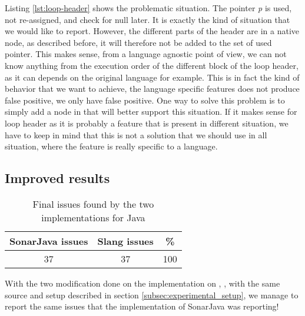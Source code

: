 

Listing \ref{lst:loop-header} shows the problematic situation. The pointer \emph{p} is used, not re-assigned, and check for null later. 
It is exactly the kind of situation that we would like to report. 
However, the different parts of the header are in a native node, as described before, it will therefore not be added to the set of used pointer. 
This makes sense, from a language agnostic point of view, we can not know anything from the execution order of the different block of the loop header, as it can depends on the original language for example. 
This is in fact the kind of behavior that we want to achieve, the language specific features does not produce false positive, we only have false positive. 
One way to solve this problem is to simply add a node in \slang that will better support this situation. 
If it makes sense for loop header as it is probably a feature that is present in different situation, we have to keep in mind that this is not a solution that we should use in all situation, where the feature is really specific to a language.

\subsection{Improved results}
\label{subsec:improved_results}

\begin{table}[h]
	\centering
	\caption{Final issues found by the two implementations for Java}
	\label{table:final-sonarjava-vs-slang}
	\begin{tabular}{|c|c|c|}
		\hline
		\bf SonarJava issues & \bf Slang issues & \bf \% \\ \hline
		37 &  37 &  100 \\ \hline
	\end{tabular}
\end{table}

With the two modification done on the implementation on \slang, , with the same source and setup described in section \ref{subsec:experimental_setup}, we manage to report the same issues that the implementation of SonarJava was reporting!

